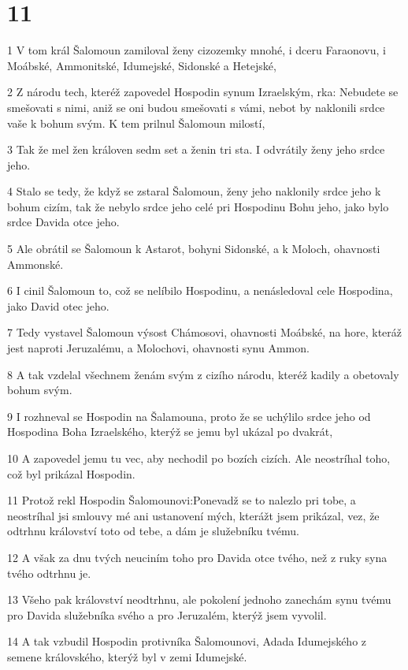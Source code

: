 \chapter{11}

\par 1 V tom král Šalomoun zamiloval ženy cizozemky mnohé, i dceru Faraonovu, i Moábské, Ammonitské, Idumejské, Sidonské a Hetejské,
\par 2 Z národu tech, kteréž zapovedel Hospodin synum Izraelským, rka: Nebudete se smešovati s nimi, aniž se oni budou smešovati s vámi, nebot by naklonili srdce vaše k bohum svým. K tem prilnul Šalomoun milostí,
\par 3 Tak že mel žen královen sedm set a ženin tri sta. I odvrátily ženy jeho srdce jeho.
\par 4 Stalo se tedy, že když se zstaral Šalomoun, ženy jeho naklonily srdce jeho k bohum cizím, tak že nebylo srdce jeho celé pri Hospodinu Bohu jeho, jako bylo srdce Davida otce jeho.
\par 5 Ale obrátil se Šalomoun k Astarot, bohyni Sidonské, a k Moloch, ohavnosti Ammonské.
\par 6 I cinil Šalomoun to, což se nelíbilo Hospodinu, a nenásledoval cele Hospodina, jako David otec jeho.
\par 7 Tedy vystavel Šalomoun výsost Chámosovi, ohavnosti Moábské, na hore, kteráž jest naproti Jeruzalému, a Molochovi, ohavnosti synu Ammon.
\par 8 A tak vzdelal všechnem ženám svým z cizího národu, kteréž kadily a obetovaly bohum svým.
\par 9 I rozhneval se Hospodin na Šalamouna, proto že se uchýlilo srdce jeho od Hospodina Boha Izraelského, kterýž se jemu byl ukázal po dvakrát,
\par 10 A zapovedel jemu tu vec, aby nechodil po bozích cizích. Ale neostríhal toho, což byl prikázal Hospodin.
\par 11 Protož rekl Hospodin Šalomounovi:Ponevadž se to nalezlo pri tobe, a neostríhal jsi smlouvy mé ani ustanovení mých, kterážt jsem prikázal, vez, že odtrhnu království toto od tebe, a dám je služebníku tvému.
\par 12 A však za dnu tvých neuciním toho pro Davida otce tvého, než z ruky syna tvého odtrhnu je.
\par 13 Všeho pak království neodtrhnu, ale pokolení jednoho zanechám synu tvému pro Davida služebníka svého a pro Jeruzalém, kterýž jsem vyvolil.
\par 14 A tak vzbudil Hospodin protivníka Šalomounovi, Adada Idumejského z semene královského, kterýž byl v zemi Idumejské.
